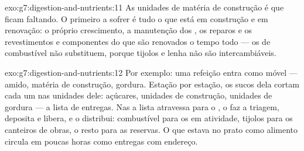 \begin{solution}{exo:g7:digestion-and-nutrients:11}
As unidades de matéria de construção é que ficam faltando. O primeiro
a sofrer é tudo o que está em construção e em renovação: o próprio
crescimento, a manutenção dos , os reparos e os revestimentos
e componentes do  que são renovados o tempo todo --- os
 de combustível não substituem, porque tijolos e lenha não
são intercambiáveis.
\end{solution}

\begin{solution}{exo:g7:digestion-and-nutrients:12}
Por exemplo: uma refeição entra como móvel --- amido, matéria de
construção, gordura. Estação por estação, os sucos dela cortam cada um
nas unidades dele: açúcares, unidades de construção, unidades de
gordura --- a lista de entregas. Nas  a lista atravessa para
o , o  faz a triagem, deposita e libera, e o 
distribui: combustível para os  em atividade, tijolos para os
canteiros de obras, o resto para as reservas. O que estava no prato
como alimento circula em poucas horas como entregas com endereço.
\end{solution}

